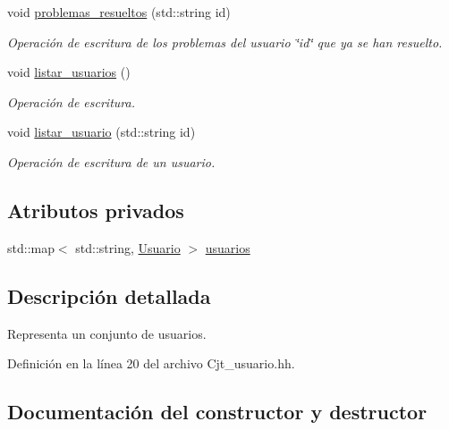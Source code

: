 \begin{DoxyCompactItemize}
void \mbox{\hyperlink{class_cjt__usuario_aa1cfea5c4294317758f260033f9fbd3f}{problemas\+\_\+resueltos}} (std\+::string id)
\begin{DoxyCompactList}\small\item\em Operación de escritura de los problemas del usuario \char`\"{}id\char`\"{} que ya se han resuelto. \end{DoxyCompactList}\item 
void \mbox{\hyperlink{class_cjt__usuario_a4cd3e0812c3b3d7e9e83c0f8d0c2acb3}{listar\+\_\+usuarios}} ()
\begin{DoxyCompactList}\small\item\em Operación de escritura. \end{DoxyCompactList}\item 
void \mbox{\hyperlink{class_cjt__usuario_aa1b390ae2335eb486d2a0c8c32643d5c}{listar\+\_\+usuario}} (std\+::string id)
\begin{DoxyCompactList}\small\item\em Operación de escritura de un usuario. \end{DoxyCompactList}\end{DoxyCompactItemize}
\subsection*{Atributos privados}
\begin{DoxyCompactItemize}
\item 
std\+::map$<$ std\+::string, \mbox{\hyperlink{class_usuario}{Usuario}} $>$ \mbox{\hyperlink{class_cjt__usuario_af814d06f1c52bc2e744d253d20ce6e6b}{usuarios}}
\end{DoxyCompactItemize}


\subsection{Descripción detallada}
Representa un conjunto de usuarios. 

Definición en la línea 20 del archivo Cjt\+\_\+usuario.\+hh.



\subsection{Documentación del constructor y destructor}
\mbox{\label{class_cjt__usuario_aa14539b3419a33c42158996d16cdcf2f}} 
